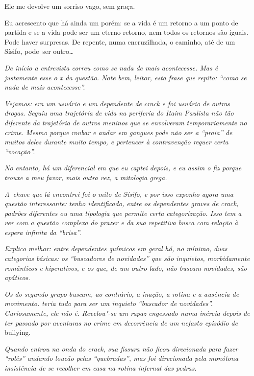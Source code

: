Ele me devolve um sorriso vago, sem graça.

Eu acrescento que há ainda um porém: se a vida é um retorno a um ponto
de partida e se a vida pode ser um eterno retorno, nem todos os retornos
são iguais. Pode haver surpresas. De repente, numa encruzilhada, o
caminho, até de um Sísifo, pode~ser outro…

\begin{center}\asterisc{}\end{center}
\begingroup\small

\emph{De início a entrevista correu como se nada de mais acontecesse. Mas
é justamente esse o x da questão. Note bem, leitor, esta frase que
repito: ``como se nada de mais acontecesse''.}

\emph{Vejamos:  era um usuário e um dependente de crack e foi usuário
de outras drogas. Seguiu uma trajetória de vida na periferia do Itaim
Paulista não tão diferente da trajetória de outros meninos que se
envolveram temporariamente no crime. Mesmo porque roubar e andar em
gangues pode não ser a ``praia'' de muitos deles durante muito tempo, e
pertencer à contravenção requer certa ``vocação''.}

\emph{No entanto, há um diferencial em  que eu captei depois, e eu
assim o fiz porque trouxe a meu favor, mais outra vez, a mitologia
grega.}

\emph{A~chave que lá encontrei foi o mito de Sísifo, e por isso exponho
agora uma questão interessante: tenho identificado, entre os dependentes
graves de crack, padrões diferentes ou uma tipologia que permite certa
categorização. Isso tem a ver com a questão complexa do prazer e da sua
repetitiva busca com relação à espera infinita da ``brisa''.}

\emph{Explico melhor: entre dependentes químicos em geral há, no mínimo,
duas categorias básicas: os ``buscadores de novidades'' que são
inquietos, morbidamente românticos e hiperativos, e os que, de um outro
lado, não buscam novidades, são apáticos.}

\emph{Os do segundo grupo buscam, ao contrário, a inação, a rotina e a
ausência de movimento.  teria tudo para ser um inquieto ``buscador de
novidades''. Curiosamente, ele não é. Revelou"-se um rapaz engessado numa
inércia depois de ter passado por aventuras no crime em decorrência de
um nefasto episódio de} bullying.

\emph{Quando  entrou na onda do crack, sua fissura não ficou
direcionada para fazer ``rolês'' andando loucão pelas ``quebradas'', mas
foi direcionada pela monótona insistência de se recolher em casa na
rotina infernal das pedras.}

